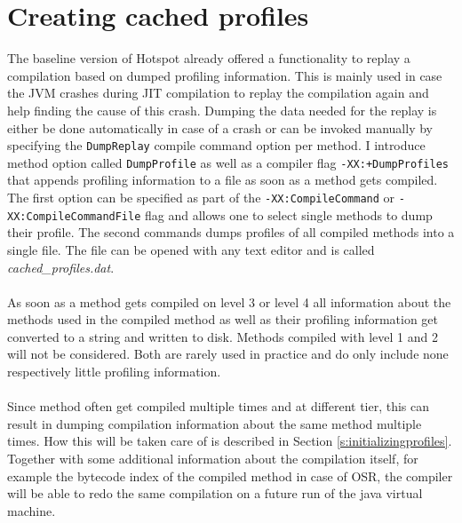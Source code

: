 \section{Creating cached profiles}
\label{s:creatingprofiles}
The baseline version of Hotspot already offered a functionality to replay a compilation based on dumped profiling information.
This is mainly used in case the JVM crashes during JIT compilation to replay the compilation again and help finding the cause of this crash.
Dumping the data needed for the replay is either be done automatically in case of a crash or can be invoked manually by specifying the \texttt{DumpReplay} compile command option per method.
I introduce method option called \texttt{DumpProfile} as well as a compiler flag \texttt{-XX:+DumpProfiles} that appends profiling information to a file as soon as a method gets compiled. The first option can be specified as part of the \texttt{-XX:CompileCommand} or \texttt{-XX:CompileCommandFile} flag and allows one to select single methods to dump their profile. The second commands dumps profiles of all compiled methods into a single file.
The file can be opened with any text editor and is called \textit{cached\_profiles.dat}.
\\\\
As soon as a method gets compiled on level 3 or level 4 all information about the methods used in the compiled method as well as their profiling information get converted to a string and written to disk. Methods compiled with level 1 and 2 will not be considered. Both are rarely used in practice and do only include none respectively little profiling information.
\\\\
Since method often get compiled multiple times and at different tier, this can result in dumping compilation information about the same method multiple times. How this will be taken care of is described in Section \ref{s:initializingprofiles}.
Together with some additional information about the compilation itself, for example the bytecode index of the compiled method in case of OSR, the compiler will be able to redo the same compilation on a future run of the java virtual machine.  
